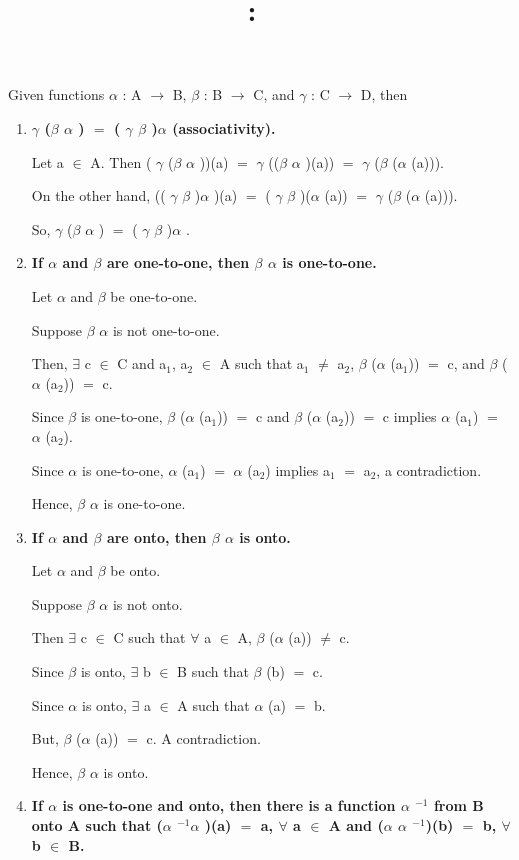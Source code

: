 \documentclass{article}
\title{
    \vspace{2in}
    \textmd{\textbf{\hmwkClass:\ \hmwkTitle}}\\
    \normalsize\vspace{0.1in}\small\vspace{0.1in}\large{\textit{\hmwkClassInstructor}}
    \vspace{3in}
}
\author{\hmwkAuthorName}
\date{}
\newcommand{\mt}[1]{\ensuremath{#1}}
\newcommand{\fa}{\mt{\forall} }          %
\newcommand{\afa}{\mt{\alpha} }
\newcommand{\bta}{\mt{\beta} }
\newcommand{\mem}{\mt{\in} }
\newcommand{\exs}{\mt{\exists} }
\newcommand{\lra}{ \mt{\longrightarrow} } %
\newcommand{\eql}{\mt{=} }
\newcommand{\uw}[2]{#1\mt{_{#2}}}
\newcommand{\uf}[2]{#1\mt{^{#2}}}
\newcommand{\lcg}{ \mt{\gamma} }
\begin{document}
Given functions \afa: A \lra B, \bta: B \lra C, and \lcg: C \lra D, then

\begin{enumerate}
  \item \textbf{\lcg(\bta\afa) \eql (\lcg\bta)\afa (associativity).}

Let a \mem A. Then (\lcg(\bta\afa))(a) \eql \lcg((\bta\afa)(a)) \eql \lcg(\bta(\afa(a))).

On the other hand, ((\lcg\bta)\afa)(a) \eql (\lcg\bta)(\afa(a)) \eql \lcg(\bta(\afa(a))).

So, \lcg(\bta\afa) \eql (\lcg\bta)\afa.

  \item \textbf{If \afa and \bta are one-to-one, then \bta\afa is one-to-one.}
  
  Let \afa and \bta be one-to-one.
  
  Suppose \bta\afa is not one-to-one.
  
  Then, \exs c \mem C and \uw{a}{1}, \uw{a}{2} \mem A such that \uw{a}{1} $\neq$ \uw{a}{2}, \bta(\afa(\uw{a}{1})) \eql c, and \bta(\afa(\uw{a}{2})) \eql c.
  
  Since \bta is one-to-one, \bta(\afa(\uw{a}{1})) \eql c and \bta(\afa(\uw{a}{2})) \eql c implies \afa(\uw{a}{1}) \eql \afa(\uw{a}{2}).
  
  Since \afa is one-to-one, \afa(\uw{a}{1}) \eql \afa(\uw{a}{2}) implies \uw{a}{1} \eql \uw{a}{2}, a contradiction.
  
  Hence, \bta\afa is one-to-one.
  
  \item \textbf{If \afa and \bta are onto, then \bta\afa is onto.}
  
  Let \afa and \bta be onto.
  
  Suppose \bta\afa is not onto.
  
  Then \exs c \mem C such that \fa a \mem A, \bta(\afa(a)) $\neq$ c. 
  
  Since \bta is onto, \exs b \mem B such that \bta(b) \eql c.
  
  Since \afa is onto, \exs a \mem A such that \afa(a) \eql b.
  
  But, \bta(\afa(a)) \eql c. A contradiction.
  
  Hence, \bta\afa is onto.
  
  \item \textbf{If \afa is one-to-one and onto, then there is a function \uf{\afa}{-1} from B onto A such that (\uf{\afa}{-1}\afa)(a) \eql a, \fa a \mem A and (\afa\uf{\afa}{-1})(b) \eql b, \fa b \mem B.}
  

\end{enumerate}
\end{document}
